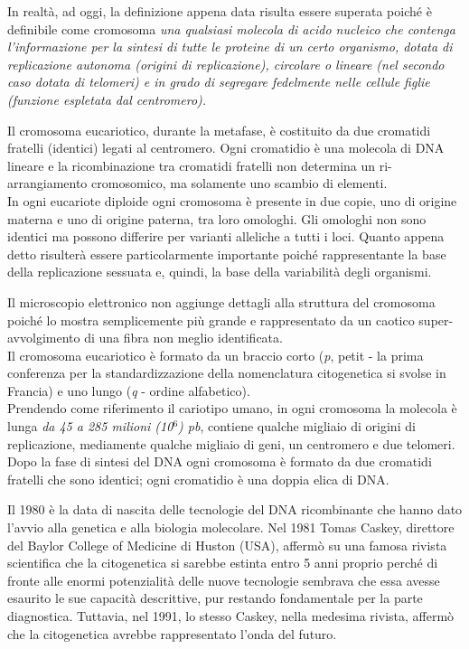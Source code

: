\documentclass[11pt]{book}
\begin{document}
In realtà, ad oggi, la definizione appena data risulta essere superata poiché è definibile come cromosoma \emph{una qualsiasi molecola di acido nucleico che contenga l’informazione per la sintesi di tutte le proteine di un certo organismo, dotata di replicazione autonoma (origini di replicazione), circolare o lineare (nel secondo caso dotata di telomeri) e in grado di segregare fedelmente nelle cellule figlie (funzione espletata dal centromero).}

Il cromosoma eucariotico, durante la metafase, è costituito da due cromatidi fratelli (identici) legati al centromero. Ogni cromatidio è una molecola di DNA lineare e la ricombinazione tra cromatidi fratelli non determina un ri-arrangiamento cromosomico, ma solamente uno scambio di elementi.\\
In ogni eucariote diploide ogni cromosoma è presente in due copie, uno di origine materna e uno di origine paterna, tra loro omologhi. Gli omologhi non sono identici ma possono differire per varianti alleliche a tutti i loci.
Quanto appena detto risulterà essere particolarmente importante poiché rappresentante la base della replicazione sessuata e, quindi, la base della variabilità degli organismi.  

Il microscopio elettronico non aggiunge dettagli alla struttura del cromosoma poiché lo mostra semplicemente più grande e rappresentato da un caotico super-avvolgimento di una fibra non meglio identificata.\\
Il cromosoma eucariotico è formato da un braccio corto (\emph{p}, petit - la prima conferenza per la standardizzazione della nomenclatura citogenetica si svolse in Francia) e uno lungo (\emph{q} - ordine alfabetico).\\
Prendendo come riferimento il cariotipo umano, in ogni cromosoma la molecola è lunga \emph{da 45 a 285 milioni (10\(^6\)) pb}, contiene qualche migliaio di origini di replicazione, mediamente qualche migliaio di geni, un centromero e due telomeri.
Dopo la fase di sintesi del DNA ogni cromosoma è formato da due cromatidi fratelli che sono identici; ogni cromatidio è una doppia elica di DNA.

Il 1980 è la data di nascita delle tecnologie del DNA ricombinante che hanno dato l’avvio alla genetica e alla biologia molecolare. Nel 1981 Tomas Caskey, direttore del Baylor College of Medicine di Huston (USA), affermò su una famosa rivista scientifica che la citogenetica si sarebbe estinta entro 5 anni proprio perché di fronte alle enormi potenzialità delle nuove tecnologie sembrava che essa avesse esaurito le sue capacità descrittive, pur restando fondamentale per la parte diagnostica. 
Tuttavia, nel 1991, lo stesso Caskey, nella medesima rivista, affermò che la citogenetica avrebbe rappresentato l’onda del futuro. 
\end{document}

